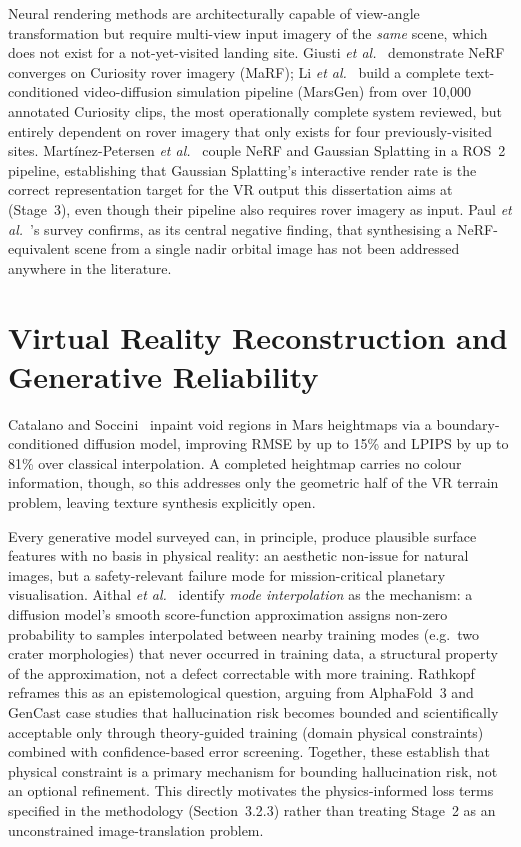Neural rendering methods are architecturally capable of view-angle transformation but require multi-view input imagery of the \emph{same} scene, which does not exist for a not-yet-visited landing site. Giusti \textit{et al.}~\cite{giusti2022marf} demonstrate NeRF converges on Curiosity rover imagery (MaRF); Li \textit{et al.}~\cite{li2025martian} build a complete text-conditioned video-diffusion simulation pipeline (MarsGen) from over 10,000 annotated Curiosity clips, the most operationally complete system reviewed, but entirely dependent on rover imagery that only exists for four previously-visited sites. Mart\'{i}nez-Petersen \textit{et al.}~\cite{martinezpetersen2025hifi} couple NeRF and Gaussian Splatting in a ROS~2 pipeline, establishing that Gaussian Splatting's interactive render rate is the correct representation target for the VR output this dissertation aims at (Stage~3), even though their pipeline also requires rover imagery as input. Paul \textit{et al.}~\cite{paul2025nerfspace}'s survey confirms, as its central negative finding, that synthesising a NeRF-equivalent scene from a single nadir orbital image has not been addressed anywhere in the literature.

\section{Virtual Reality Reconstruction and Generative Reliability}

Catalano and Soccini~\cite{catalano2025inpainting} inpaint void regions in Mars heightmaps via a boundary-conditioned diffusion model, improving RMSE by up to 15\% and LPIPS by up to 81\% over classical interpolation. A completed heightmap carries no colour information, though, so this addresses only the geometric half of the VR terrain problem, leaving texture synthesis explicitly open.

Every generative model surveyed can, in principle, produce plausible surface features with no basis in physical reality: an aesthetic non-issue for natural images, but a safety-relevant failure mode for mission-critical planetary visualisation. Aithal \textit{et al.}~\cite{aithal2024hallucination} identify \emph{mode interpolation} as the mechanism: a diffusion model's smooth score-function approximation assigns non-zero probability to samples interpolated between nearby training modes (e.g.\ two crater morphologies) that never occurred in training data, a structural property of the approximation, not a defect correctable with more training. Rathkopf~\cite{rathkopf2025reliability} reframes this as an epistemological question, arguing from AlphaFold~3 and GenCast case studies that hallucination risk becomes bounded and scientifically acceptable only through theory-guided training (domain physical constraints) combined with confidence-based error screening. Together, these establish that physical constraint is a primary mechanism for bounding hallucination risk, not an optional refinement. This directly motivates the physics-informed loss terms specified in the methodology (Section~3.2.3) rather than treating Stage~2 as an unconstrained image-translation problem.

